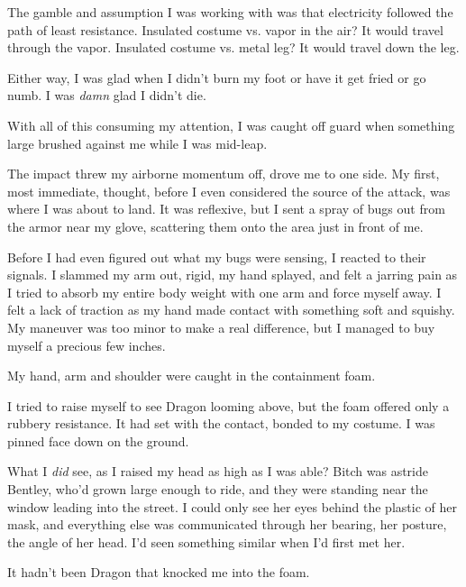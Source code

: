 The gamble and assumption I was working with was that electricity followed the path of least resistance.  Insulated costume vs. vapor in the air?  It would travel through the vapor.  Insulated costume vs. metal leg?  It would travel down the leg.



Either way, I was glad when I didn't burn my foot or have it get fried or go numb.  I was \emph{damn} glad I didn't die.



With all of this consuming my attention, I was caught off guard when something large brushed against me while I was mid-leap.



The impact threw my airborne momentum off, drove me to one side.  My first, most immediate, thought, before I even considered the source of the attack, was where I was about to land.  It was reflexive, but I sent a spray of bugs out from the armor near my glove, scattering them onto the area just in front of me.



Before I had even figured out what my bugs were sensing, I reacted to their signals.  I slammed my arm out, rigid, my hand splayed, and felt a jarring pain as I tried to absorb my entire body weight with one arm and force myself away.  I felt a lack of traction as my hand made contact with something soft and squishy.  My maneuver was too minor to make a real difference, but I managed to buy myself a precious few inches.



My hand, arm and shoulder were caught in the containment foam.



I tried to raise myself to see Dragon looming above, but the foam offered only a rubbery resistance.  It had set with the contact, bonded to my costume.  I was pinned face down on the ground.



What I \emph{did} see, as I raised my head as high as I was able?  Bitch was astride Bentley, who'd grown large enough to ride, and they were standing near the window leading into the street.  I could only see her eyes behind the plastic of her mask, and everything else was communicated through her bearing, her posture, the angle of her head.  I'd seen something similar when I'd first met her.



It hadn't been Dragon that knocked me into the foam.



